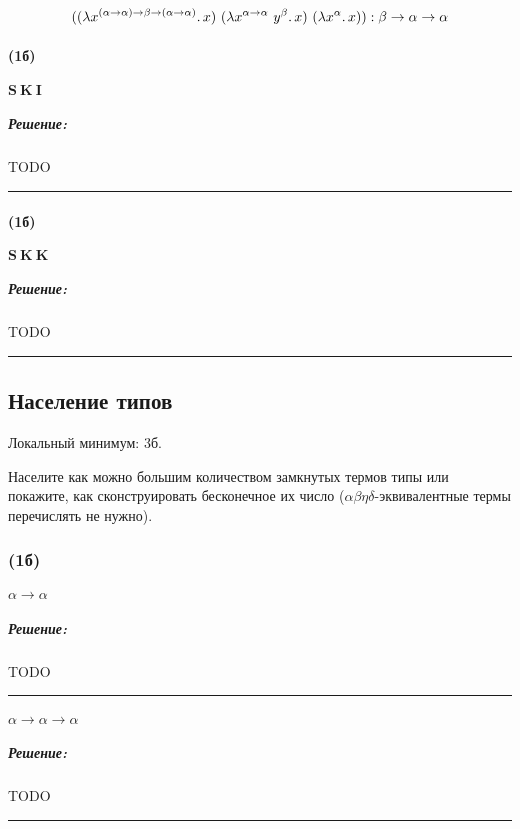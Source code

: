 \documentclass{article}
\newenvironment{proof}{\subparagraph{\hspace{-1em}Решение:\newline}}{\par\noindent\rule{\textwidth}{0.4pt}}
\newcommand{\term}[1]{\mathbf{#1}}
\newcommand{\ap}{~}
\begin{document}
    \[((\lambda x^{(\alpha \to \alpha) \to \beta \to (\alpha \to \alpha)}\ldotp x) \ap (\lambda x^{\alpha \to \alpha} \ap y^\beta\ldotp x) \ap (\lambda x^\alpha\ldotp x)):
    \beta \to \alpha \to \alpha\]

    \paragraph{(1б)} $\term{S} \ap \term{K} \ap \term{I}$

    \begin{proof}
        TODO %
    \end{proof}

    \paragraph{(1б)} $\term{S} \ap \term{K} \ap \term{K}$

    \begin{proof}
        TODO %
    \end{proof}

    \subsection{Население типов}

    Локальный минимум: 3б.

    Населите как можно большим количеством замкнутых термов типы или покажите, как
    сконструировать бесконечное их число ($\alpha\beta\eta\delta$-эквивалентные
    термы перечислять не нужно).

    \subsubsection{(1б)}

    \paragraph{} $\alpha \to \alpha$

    \begin{proof}
        TODO %
    \end{proof}

    \paragraph{} $\alpha \to \alpha \to \alpha$

    \begin{proof}
        TODO %
    \end{proof}
\end{document}
